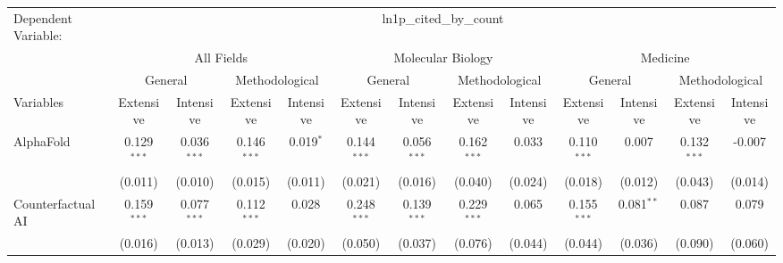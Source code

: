 \begingroup
\centering
\begin{tabular}{lcccccccccccc}
   \tabularnewline \midrule \midrule
   Dependent Variable: & \multicolumn{12}{c}{ln1p\_cited\_by\_count}\\
 & \multicolumn{4}{c}{All Fields} & \multicolumn{4}{c}{Molecular Biology} & \multicolumn{4}{c}{Medicine} \\
\cmidrule(lr){2-5} \cmidrule(lr){6-9} \cmidrule(lr){10-13}
 & \multicolumn{2}{c}{General} & \multicolumn{2}{c}{Methodological} & \multicolumn{2}{c}{General} & \multicolumn{2}{c}{Methodological} & \multicolumn{2}{c}{General} & \multicolumn{2}{c}{Methodological} \\
\cmidrule(lr){2-3} \cmidrule(lr){4-5} \cmidrule(lr){6-7} \cmidrule(lr){8-9} \cmidrule(lr){10-11} \cmidrule(lr){12-13}
Variables & \multicolumn{1}{c}{Extensive} & \multicolumn{1}{c}{Intensive} & \multicolumn{1}{c}{Extensive} & \multicolumn{1}{c}{Intensive} & \multicolumn{1}{c}{Extensive} & \multicolumn{1}{c}{Intensive} & \multicolumn{1}{c}{Extensive} & \multicolumn{1}{c}{Intensive} & \multicolumn{1}{c}{Extensive} & \multicolumn{1}{c}{Intensive} & \multicolumn{1}{c}{Extensive} & \multicolumn{1}{c}{Intensive} \\
\cmidrule(lr){1-1}\cmidrule(lr){2-2} \cmidrule(lr){3-3} \cmidrule(lr){4-4} \cmidrule(lr){5-5} \cmidrule(lr){6-6} \cmidrule(lr){7-7} \cmidrule(lr){8-8} \cmidrule(lr){9-9} \cmidrule(lr){10-10} \cmidrule(lr){11-11} \cmidrule(lr){12-12} \cmidrule(lr){13-13}
   AlphaFold                                & 0.129$^{***}$  & 0.036$^{***}$  & 0.146$^{***}$ & 0.019$^{*}$  & 0.144$^{***}$  & 0.056$^{***}$  & 0.162$^{***}$ & 0.033         & 0.110$^{***}$  & 0.007          & 0.132$^{***}$ & -0.007\\   
                                            & (0.011)        & (0.010)        & (0.015)       & (0.011)      & (0.021)        & (0.016)        & (0.040)       & (0.024)       & (0.018)        & (0.012)        & (0.043)       & (0.014)\\   
   Counterfactual AI                        & 0.159$^{***}$  & 0.077$^{***}$  & 0.112$^{***}$ & 0.028        & 0.248$^{***}$  & 0.139$^{***}$  & 0.229$^{***}$ & 0.065         & 0.155$^{***}$  & 0.081$^{**}$   & 0.087         & 0.079\\   
                                            & (0.016)        & (0.013)        & (0.029)       & (0.020)      & (0.050)        & (0.037)        & (0.076)       & (0.044)       & (0.044)        & (0.036)        & (0.090)       & (0.060)\\   

\end{tabular}
